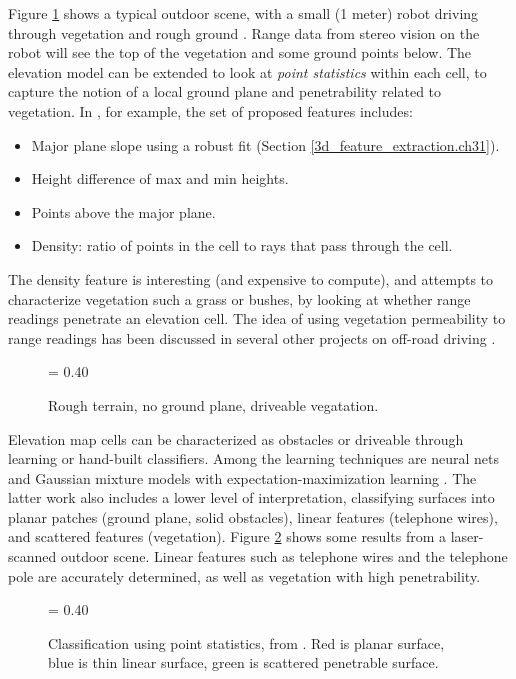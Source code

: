 \documentclass[twocolumn,oneside]{book}
\begin{document}
Figure \ref{rough_terrain.ch31} shows a typical outdoor scene, with a
small (1 meter) robot driving through vegetation and rough ground
\cite{konolige06}.  Range data from stereo vision on the robot will
see the top of the vegetation and some ground points below.  The
elevation model can be extended to look at {\em point statistics}
within each cell, to capture the notion of a local ground plane and
penetrability related to vegetation.  In \cite{ollis06}, for
example, the set of proposed features includes:
\begin{itemize}
\item Major plane slope using a robust fit (Section
\ref{3d_feature_extraction.ch31}). 
\item Height difference of max and min heights.
\item Points above the major plane.
\item Density: ratio of points in the cell to rays that pass through
the cell.
\end{itemize}
The density feature is interesting (and expensive to compute), and
attempts to characterize vegetation such a grass or bushes, by looking
at whether range readings penetrate an elevation cell.  The idea of
using vegetation permeability to range readings has been discussed in
several other projects on off-road driving
\cite{manduchi03,lalonde05,kelly05}.  

\begin{figure}[hbt]
{\epsfxsize = 0.40\textwidth {}}
\caption{Rough terrain, no ground plane, driveable vegatation.
\label{rough_terrain.ch31}}
\end{figure}

Elevation map cells can be characterized as obstacles or driveable
through learning or hand-built classifiers.  Among the learning
techniques are neural nets \cite{ollis06} and Gaussian mixture
models with expectation-maximization learning \cite{vandapel06}.
The latter work also includes a lower level of interpretation,
classifying surfaces into planar patches (ground plane, solid
obstacles), linear features (telephone wires), and scattered features
(vegetation).  Figure \ref{point_classified.ch31} shows some results
from a laser-scanned outdoor scene.  Linear features such as telephone
wires and the telephone pole are accurately determined, as well as
vegetation with high penetrability.

\begin{figure}[hbt]
{\epsfxsize = 0.40\textwidth {}}
\caption{Classification using point statistics, from
\cite{vandapel06}.  Red is planar surface, blue is thin linear
surface, green is scattered penetrable surface.
\label{point_classified.ch31}}
\end{figure}
\end{document}

